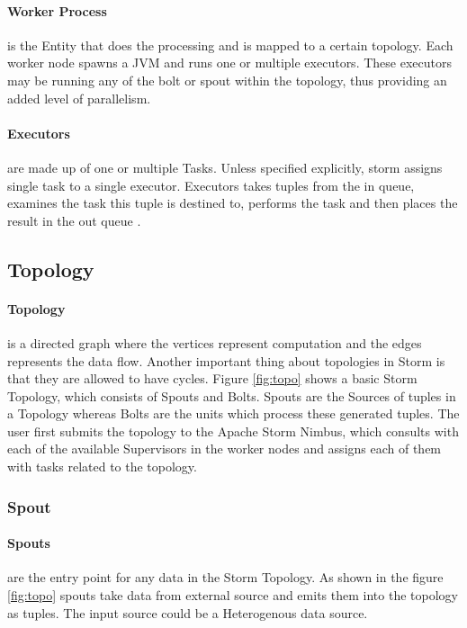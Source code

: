 \documentclass[runningheads,a4paper]{llncs}[2015/06/24]
\begin{document}
\paragraph{Worker Process} is the Entity that does the processing and is mapped to a certain topology. Each worker node spawns a JVM and runs one or multiple executors. These executors may be running any of the bolt or spout within the topology, thus providing an added level of parallelism.

\paragraph{Executors} are made up of one or multiple Tasks. Unless specified explicitly, storm assigns single task to a single executor. Executors takes tuples from the in queue, examines the task this tuple is destined to, performs the task and then places the result in the out queue \cite{stormtwitter}.

\subsection{Topology}
\paragraph{Topology} is a directed graph where the vertices represent computation and the edges represents the data flow. Another important thing about topologies in Storm is that they are allowed to have cycles. Figure \ref{fig:topo} shows a basic Storm Topology, which consists of Spouts and Bolts. Spouts are the Sources of tuples in a Topology whereas Bolts are the units which process these generated tuples. The user first submits the topology to the Apache Storm Nimbus, which consults with each of the available Supervisors in the worker nodes and assigns each of them with tasks related to the topology.

\subsubsection{Spout} 
\paragraph{Spouts} are the entry point for any data in the Storm Topology. As shown in the figure \ref{fig:topo} spouts take data from external source and emits them into the topology as tuples. The input source could be a Heterogenous data source.
\end{document}
